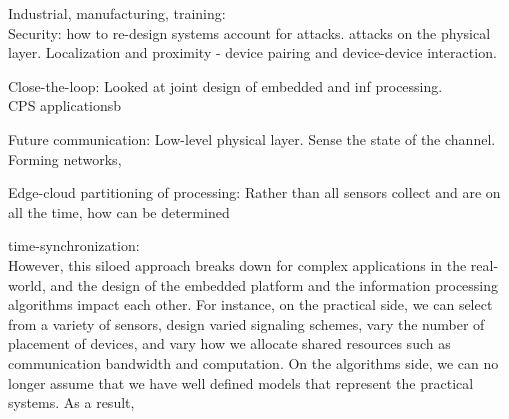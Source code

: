 \documentclass[10pt]{article}
\begin{document}
Industrial, manufacturing, training:\\

Security:
how to re-design systems account for attacks.
attacks on the physical layer.
Localization and proximity - device pairing and device-device interaction.

Close-the-loop:
Looked at joint design of embedded and inf processing.\\
CPS applicationsb

Future communication:
Low-level physical layer. Sense the state of the channel. \\
Forming networks, 

Edge-cloud partitioning of processing:
Rather than all sensors collect and are on all the time, how can be determined






time-synchronization:\\




However, this siloed approach breaks down for complex applications in the real-world, and the design of the embedded platform and the information processing algorithms impact each other. For instance, on the practical side, we can select from a variety of sensors, design varied signaling schemes, vary the number of placement of devices, and vary how we allocate shared resources such as communication bandwidth and computation. On the algorithms side, we can no longer assume that we have well defined models that represent the practical systems. As a result, 
\end{document}
